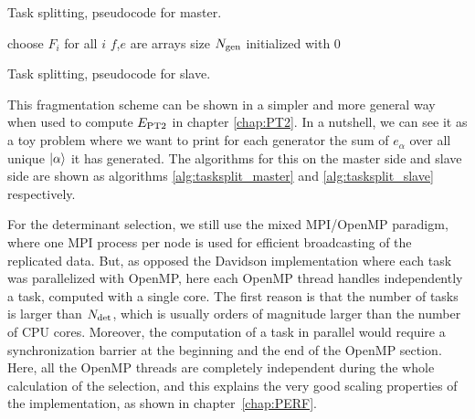 \documentclass[./thesis.tex]{subfiles}
\begin{document}
\begin{algorithm}
        \caption{Task splitting, pseudocode for master.}
        \label{alg:tasksplit_master}
        choose $F_i$ for all $i$\;
        $f$,$e$ are arrays size ${N_\text{gen}}$ initialized with $0$ \;
\end{algorithm}

\begin{algorithm}
        \caption{Task splitting, pseudocode for slave.}
        \label{alg:tasksplit_slave}
\end{algorithm}

This fragmentation scheme can be shown in a simpler and more general way when used to compute $E_\text{PT2}$ in chapter \ref{chap:PT2}. In a nutshell, we can see it as a toy problem where we want to print for each generator the sum of $e_\alpha$ over all unique ${\ket{\alpha}}$ it has generated. The algorithms for this on the master side and slave side are shown as algorithms \ref{alg:tasksplit_master} and \ref{alg:tasksplit_slave} respectively.


For the determinant selection, we still use the mixed MPI/OpenMP paradigm, where one MPI process per node is used for efficient broadcasting of the replicated data. But, as opposed the Davidson implementation where each task was parallelized with OpenMP, here each OpenMP thread handles independently a task, computed with a single core. The first reason is that the number of tasks is larger than ${N_\text{det}}$, which is usually orders of magnitude larger than the number of CPU cores. Moreover, the computation of a task in parallel would require a synchronization barrier at the beginning and the end of the OpenMP section. Here, all the OpenMP threads are completely independent during the whole calculation of the selection, and this explains the very good scaling properties of the implementation, as shown in chapter~\ref{chap:PERF}.
\end{document}

